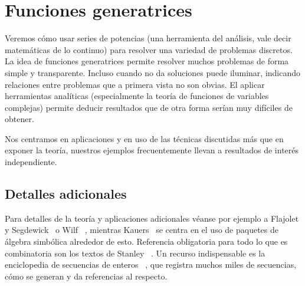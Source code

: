 %

\chapter{Funciones generatrices}
\label{cha:funciones-generatrices}

  Veremos cómo usar series de potencias%
  (una herramienta del análisis,
   vale decir matemáticas de lo continuo)
  para resolver una variedad de problemas discretos.
  La idea de funciones generatrices
  permite resolver muchos problemas
  de forma simple y transparente.
  Incluso cuando no da soluciones puede iluminar,
  indicando relaciones entre problemas
  que a primera vista no son obvias.
  El aplicar herramientas analíticas
  (especialmente la teoría de funciones de variables complejas)%
  permite deducir resultados
  que de otra forma serían muy difíciles de obtener.

  Nos centramos en aplicaciones y en uso de las técnicas discutidas
  más que en exponer la teoría,
  nuestros ejemplos frecuentemente
  llevan a resultados de interés independiente.

\section{Detalles adicionales}
\label{sec:detalles-adicionales}

  Para detalles de la teoría y aplicaciones adicionales
  véanse por ejemplo a Flajolet y Segdewick~%
    \cite{flajolet09:_analy_combin}
  o Wilf~%
    \cite{wilf06:_gfology},
  mientras Kauers~%
    \cite{kauers11:_concr_tetrah}
  se centra en el uso de paquetes de álgebra simbólica
  alrededor de esto.%
  Referencia obligatoria para todo lo que es combinatoria
  son los textos de Stanley~%
    \cite{stanley12:_enumer_combin-1,
	  stanley99:_enumer_combin-2}.
  Un recurso indispensable
  es la enciclopedia de secuencias de enteros~%
    \cite{sloane:_OEIS},%
  que registra muchos miles de secuencias,
  cómo se generan y da referencias al respecto.

